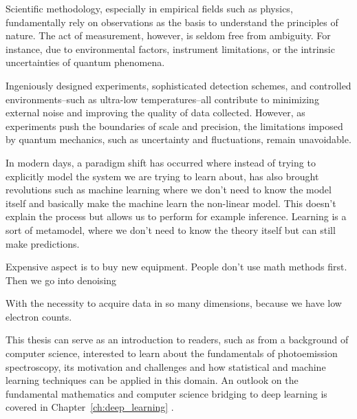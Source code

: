 Scientific methodology, especially in empirical fields such as physics, fundamentally rely on observations as the basis to understand the principles of nature. The act of measurement, however, is seldom free from ambiguity. For instance, due to environmental factors, instrument limitations, or the intrinsic uncertainties of quantum phenomena. 

Ingeniously designed experiments, sophisticated detection schemes, and controlled environments--such as ultra-low temperatures--all contribute to minimizing external noise and improving the quality of data collected. However, as experiments push the boundaries of scale and precision, the limitations imposed by quantum mechanics, such as uncertainty and fluctuations, remain unavoidable.


In modern days, a paradigm shift has occurred where instead of trying to explicitly model the system we are trying to learn about, 
has also brought revolutions such as machine learning where we don't need to know the model itself and basically make the machine learn the non-linear model. This doesn't explain the process but allows us to perform for example inference. Learning is a sort of metamodel, where we don't need to know the theory itself but can still make predictions.


Expensive aspect is to buy new equipment. People don't use math methods first.
Then we go into denoising 

With the necessity to acquire data in so many dimensions, because we have low electron counts.




This thesis can serve as an introduction to readers, such as from a background of computer science, interested to learn about the fundamentals of photoemission spectroscopy, its motivation and challenges and how statistical and machine learning techniques can be applied in this domain. An outlook on the fundamental mathematics and computer science bridging to deep learning is covered in Chapter~\ref{ch:deep_learning} .